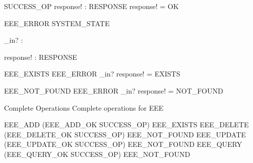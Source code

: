 \begin{schema}{SUCCESS\_OP}
response! : RESPONSE
\where 
response! = OK
\end{schema}
\begin{schema}{EEE\_ERROR}
\Xi SYSTEM\_STATE

\also
\_in? : 

\also
response! : RESPONSE
\end{schema}
\begin{schema}{EEE\_EXISTS}
EEE\_ERROR 
\where 
\_in? \in 
\also 
response! = EXISTS
\end{schema}
\begin{schema}{EEE\_NOT\_FOUND}
EEE\_ERROR 
\where 
\_in? \notin 
\also 
response! = NOT\_FOUND
\end{schema}
Complete Operations
Complete operations for EEE
\begin{zed}
EEE\_ADD  (EEE\_ADD\_OK \land SUCCESS\_OP)
\lor EEE\_EXISTS
\also
EEE\_DELETE  (EEE\_DELETE\_OK \land SUCCESS\_OP)
\lor EEE\_NOT\_FOUND
\also
EEE\_UPDATE  (EEE\_UPDATE\_OK \land SUCCESS\_OP)
\lor EEE\_NOT\_FOUND
\also
EEE\_QUERY  (EEE\_QUERY\_OK \land SUCCESS\_OP)
\lor EEE\_NOT\_FOUND
\end{zed}
